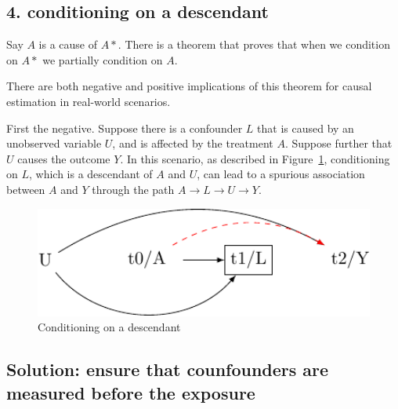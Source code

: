 \documentclass[
  singlecolumn]{report}
\begin{document}
\hypertarget{conditioning-on-a-descendant}{%
\subsection{4. conditioning on a
descendant}\label{conditioning-on-a-descendant}}

Say \(A\) is a cause of \(A*\). There is a theorem that proves that when
we condition on \(A*\) we partially condition on \(A\).

There are both negative and positive implications of this theorem for
causal estimation in real-world scenarios.

First the negative. Suppose there is a confounder \(L\) that is caused
by an unobserved variable \(U\), and is affected by the treatment \(A\).
Suppose further that \(U\) causes the outcome \(Y\). In this scenario,
as described in Figure~\ref{fig-dag-descendent}, conditioning on \(L\),
which is a descendant of \(A\) and \(U\), can lead to a spurious
association between \(A\) and \(Y\) through the path
\(A \to L \to U \to Y\).

\begin{figure}

{\centering \includegraphics[width=1\textwidth,height=\textheight]{causal-dags_files/figure-pdf/fig-dag-descendent-1.pdf}

}

\caption{\label{fig-dag-descendent}Conditioning on a descendant}

\end{figure}

\hypertarget{solution-ensure-that-counfounders-are-measured-before-the-exposure}{%
\subsection{Solution: ensure that counfounders are measured before the
exposure}\label{solution-ensure-that-counfounders-are-measured-before-the-exposure}}
\end{document}
